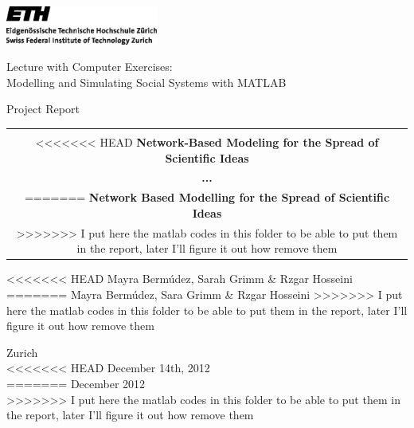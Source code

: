 
\thispagestyle{empty}

\begin{center}
\includegraphics[width=5cm]{ETHlogo.eps}

\bigskip


\bigskip


\bigskip


\LARGE{ 	Lecture with Computer Exercises:\\ }
\LARGE{ Modelling and Simulating Social Systems with MATLAB\\}

\bigskip

\bigskip

\small{Project Report}\\

\bigskip

\bigskip

\bigskip

\bigskip


\begin{tabular}{|c|}
\hline
\\
<<<<<<< HEAD
\textbf{\LARGE{Network-Based Modeling for the Spread of Scientific Ideas}}\\
\textbf{\LARGE{...}}\\
=======
\textbf{\LARGE{Network Based Modelling for the Spread of Scientific Ideas}}\\ %
>>>>>>> I put here the matlab codes in this folder to be able to put them in the report, later I'll figure it out how remove them
\\
\hline
\end{tabular}
\bigskip

\bigskip

\bigskip

<<<<<<< HEAD
\LARGE{Mayra Berm\'udez, Sarah Grimm \& Rzgar Hosseini}
=======
\LARGE{Mayra Berm\'udez, Sara Grimm \& Rzgar Hosseini}
>>>>>>> I put here the matlab codes in this folder to be able to put them in the report, later I'll figure it out how remove them



\bigskip

\bigskip

\bigskip

\bigskip

\bigskip

\bigskip

\bigskip

\bigskip

Zurich\\
<<<<<<< HEAD
December 14th, 2012\\
=======
December 2012\\
>>>>>>> I put here the matlab codes in this folder to be able to put them in the report, later I'll figure it out how remove them

\end{center}


